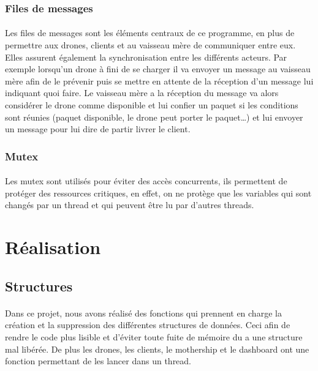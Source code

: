 \documentclass[article, backcover, french, nodocumentinfo]{upmethodology-document}
\begin{document}
			\subsubsection{Files de messages}
				\paragraph*{}
					Les files de messages sont les éléments centraux de ce programme, en plus de permettre aux drones,
					clients et au vaisseau mère de communiquer entre eux. Elles assurent également la synchronisation entre
					les différents acteurs. Par exemple lorsqu'un drone à fini de se charger il va envoyer un message au vaisseau
					mère afin de le prévenir puis se mettre en attente de la réception d'un message lui indiquant quoi faire. Le vaisseau mère a la réception
					du message va alors considérer le drone comme disponible et lui confier un paquet si les conditions sont réunies
					(paquet disponible, le drone peut porter le paquet\ldots) et lui envoyer un message pour lui dire de partir livrer le client.
			\subsubsection{Mutex}
				\paragraph*{}
					Les mutex sont utilisés pour éviter des accès concurrents, ils permettent de protéger des ressources critiques,
					en effet, on ne protège que les variables qui sont changés par un thread et qui peuvent être lu par d'autres threads.
	\section{Réalisation}
		\subsection{Structures}
			\paragraph*{}
				Dans ce projet, nous avons réalisé des fonctions qui prennent en charge la création et la suppression des différentes structures de données.
				Ceci afin de rendre le code plus lisible et d'éviter toute fuite de mémoire du a une structure mal libérée.
				De plus les drones, les clients, le mothership et le dashboard ont une fonction permettant de les lancer dans un thread.
\end{document}

